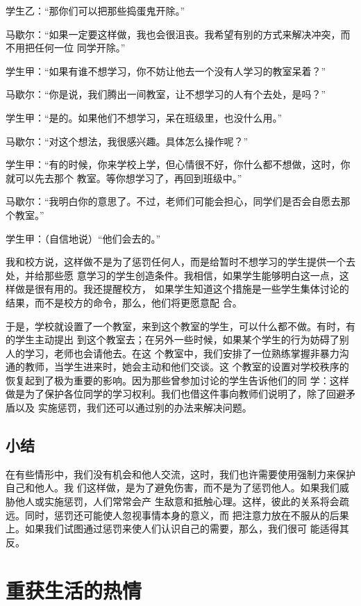 \documentclass{ctexart}
\renewenvironment{quotation}{\setlength{\parskip}{0.5em}\setstretch{1.5}\kaishu\zihao{-5}\setlength{\parindent}{1em}}{\vspace{1em}}
\begin{document}
\begin{quotation}
	学生乙：``那你们可以把那些捣蛋鬼开除。''

	马歇尔：``如果一定要这样做，我也会很沮丧。我希望有别的方式来解决冲突，而不用把任何一位
	同学开除。''

	学生甲：``如果有谁不想学习，你不妨让他去一个没有人学习的教室呆着？''

	马歇尔：``你是说，我们腾出一间教室，让不想学习的人有个去处，是吗？''

	学生甲：``是的。如果他们不想学习，呆在班级里，也没什么用。''

	马歇尔：``对这个想法，我很感兴趣。具体怎么操作呢？''

	学生甲：``有的时候，你来学校上学，但心情很不好，你什么都不想做，这时，你就可以先去那个
	教室。等你想学习了，再回到班级中。''

	马歇尔：``我明白你的意思了。不过，老师们可能会担心，同学们是否会自愿去那个教室。''

	学生甲：（自信地说）``他们会去的。''
\end{quotation}

我和校方说，这样做不是为了惩罚任何人，而是给暂时不想学习的学生提供一个去处，并给那些愿
意学习的学生创造条件。我相信，如果学生能够明白这一点，这样做是很有用的。我还提醒校方，
如果学生知道这个措施是一些学生集体讨论的结果，而不是校方的命令，那么，他们将更愿意配
合。

于是，学校就设置了一个教室，来到这个教室的学生，可以什么都不做。有时，有的学生主动提出
到这个教室去；在另外一些时候，如果某个学生的行为妨碍了别人的学习，老师也会请他去。在这
个教室中，我们安排了一位熟练掌握非暴力沟通的教师，当学生进来时，她会主动和他们交谈。这
个教室的设置对学校秩序的恢复起到了极为重要的影响。因为那些曾参加讨论的学生告诉他们的同
学：这样做是为了保护各位同学的学习权利。我们也借这件事向教师们说明了，除了回避矛盾以及
实施惩罚，我们还可以通过别的办法来解决问题。

\subsection{小结}

在有些情形中，我们没有机会和他人交流，这时，我们也许需要使用强制力来保护自己和他人。我
们这样做，是为了避免伤害，而不是为了惩罚他人。如果我们威胁他人或实施惩罚，人们常常会产
生敌意和抵触心理。这样，彼此的关系将会疏远。同时，惩罚还可能使人忽视事情本身的意义，而
把注意力放在不服从的后果上。如果我们试图通过惩罚来使人们认识自己的需要，那么，我们很可
能适得其反。


\section{重获生活的热情}\label{sec:重获生活的热情}
\end{document}
